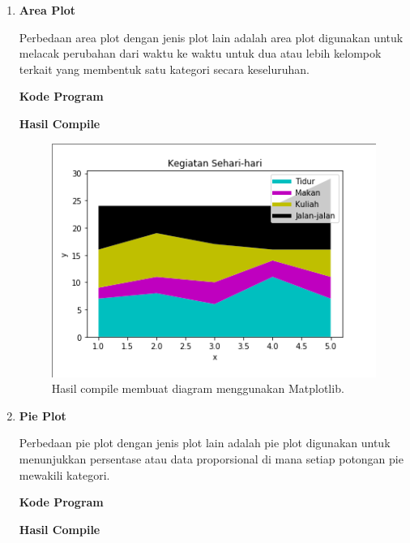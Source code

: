 \begin{enumerate}
	\item \textbf{Area Plot}
	
	Perbedaan area plot dengan jenis plot lain adalah area plot digunakan untuk melacak perubahan dari waktu ke waktu untuk dua atau lebih kelompok terkait yang membentuk satu kategori secara keseluruhan.
	
	\textbf{Kode Program}
	
	
	
	\textbf{Hasil Compile}
	
	\begin{figure}[H]
		\includegraphics[width=12cm]{figures/6/1174031/area.png}
		\centering
		\caption{Hasil compile membuat diagram menggunakan Matplotlib.}
	\end{figure}
	
	\item \textbf{Pie Plot}
	
	Perbedaan pie plot dengan jenis plot lain adalah pie plot digunakan untuk menunjukkan persentase atau data proporsional di mana setiap potongan pie mewakili kategori.
	
	\textbf{Kode Program}
	
	
	
	\textbf{Hasil Compile}
	

\end{enumerate}
